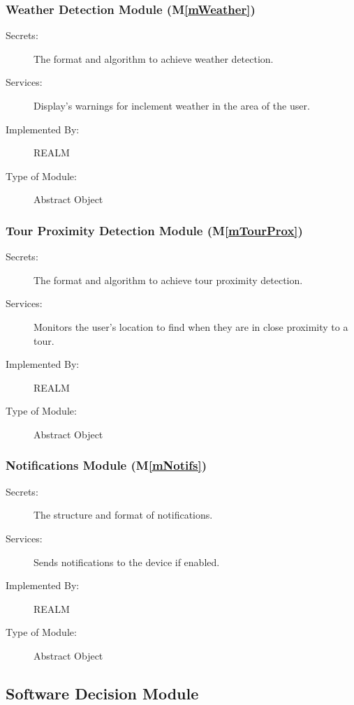 \documentclass[12pt, titlepage]{article}
\newcommand{\mref}[1]{M\ref{#1}}
\begin{document}
\subsubsection{Weather Detection Module (\mref{mWeather})}

\begin{description}
\item[Secrets:]The format and algorithm to achieve weather detection.
\item[Services:]Display's warnings for inclement weather in the area of the user.
\item[Implemented By:]REALM
\item[Type of Module:]Abstract Object
\end{description}

\subsubsection{Tour Proximity Detection Module (\mref{mTourProx})}

\begin{description}
\item[Secrets:]The format and algorithm to achieve tour proximity detection.
\item[Services:]Monitors the user's location to find when they are in close proximity to a tour.
\item[Implemented By:]REALM
\item[Type of Module:]Abstract Object
\end{description}

\subsubsection{Notifications Module (\mref{mNotifs})}

\begin{description}
\item[Secrets:]The structure and format of notifications.
\item[Services:]Sends notifications to the device if enabled.
\item[Implemented By:]REALM
\item[Type of Module:]Abstract Object
\end{description}

\subsection{Software Decision Module}
\end{document}
